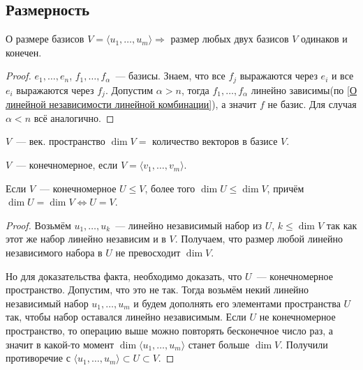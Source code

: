 \subsection{Размерность}
\begin{theorem}{О размере базисов}
    $V = \langle u_1,\dots,u_m\rangle \Rightarrow$ размер любых двух базисов $V$ одинаков и конечен.
\end{theorem}
\begin{proof}
    $e_1,\dots,e_n$, $f_1,\dots,f_\alpha$~--- базисы. Знаем, что все $f_j$
    выражаются через $e_i$ и все $e_i$ выражаются через $f_j$.
    Допустим $\alpha > n$, тогда $f_1,\dots,f_\alpha$ линейно зависимы(по \ref{О линейной независимости линейной комбинации}), а значит $f$ не базис.
    Для случая $\alpha < n$ всё аналогично.
\end{proof}
\begin{definition}
    $V$~--- век. пространство $\dim V =$ количество векторов в базисе $V$.
\end{definition}
\begin{definition}
    $V$~--- конечномерное, если $V = \langle v_1,\dots, v_m\rangle$.
\end{definition}
\begin{lemma}
    Если $V$~--- конечномерное $U \leq V$, более того $\dim U \leq \dim V$, причём $\dim U = \dim V \Leftrightarrow U=V$.
\end{lemma}
\begin{proof}
    Возьмём $u_1,\dots,u_k$~--- линейно независимый набор из $U$, $k\leq \dim V$ так как этот же набор линейно независим и в $V$. 
    Получаем, что размер любой линейно независимого набора в $U$ не превосходит $\dim V$.

    Но для доказательства факта, необходимо доказать, что $U$~--- конечномерное пространство. Допустим, что это не так.
    Тогда возьмём некий линейно независимый набор $u_1,\dots, u_m$ и будем дополнять его элементами пространства $U$ так, чтобы набор оставался линейно независимым.
    Если $U$ не конечномерное пространство, то операцию выше можно повторять бесконечное число раз,
    а значит в какой-то момент $\dim\langle u_1, \dots, u_m\rangle$ станет больше $\dim V$. 
    Получили противоречие с $\langle u_1, \dots, u_m\rangle \subset U \subset V$.
\end{proof}
